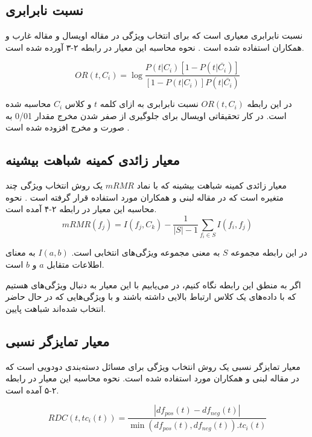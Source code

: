 \subsection{نسبت نابرابری}
نسبت نابرابری
معیاری است که برای انتخاب ویژگی در مقاله اویسال
  و مقاله غارب و همکاران  استفاده شده است
\cite{uysal2016improved}\cite{ghareb2016hybrid}
. نحوه محاسبه این معیار در رابطه ۲-۳ آورده شده است.

\begin{equation}
OR(t, C_i) = \log{\frac{P(t|C_i)[1-P(t|\bar{C_i})]}{[1-P(t|C_i)]P(t|\bar{C_i})}}
\end{equation}

در این رابطه
$OR(t, C_i)$
نسبت نابرابری به ازای کلمه
$t$
و کلاس
$C_i$
محاسبه شده است. در کار تحقیقاتی اویسال برای جلوگیری از صفر شدن مخرج مقدار 0/01 به صورت و مخرج افزوده شده است
\cite{uysal2016improved}
.

\subsection{معیار زائدی کمینه شباهت بیشینه}
معیار زائدی کمینه شباهت بیشینه
که با نماد 
$mRMR$
یک روش انتخاب ویژگی چند متغیره است که در مقاله لبنی و همکاران مورد استفاده قرار گرفته است
\cite{labani2018novel}
. نحوه محاسبه این معیار در رابطه ۲-۴ آمده است.
\begin{equation}
mRMR(f_j) = I(f_j, C_k) - \frac{1}{|S|-1} \sum_{f_i \in S} I(f_i, f_j)
\end{equation}

در این رابطه مجموعه
$S$
به معنی مجموعه ویژگی‌های انتخابی است.
$I(a, b)$
به معنای اطلاعات متقابل
$a$
و
$b$
است.

اگر به منطق این رابطه نگاه کنیم، در می‌یابیم با این معیار به دنبال ویژگی‌های هستیم که با داده‌های یک کلاس ارتباط بالایی داشته باشند و با ویژگی‌هایی که در حال حاضر انتخاب شده‌‌اند شباهت پایین.

\subsection{معیار تمایزگر نسبی}
معیار تمایزگر نسبی یک روش انتخاب ویژگی برای مسائل دسته‌بندی دودویی است که در مقاله لبنی و همکاران\cite{labani2018novel} مورد استفاده شده است. نحوه محاسبه این معیار در رابطه ۲-۵ آمده است.

\begin{equation}
RDC(t, tc_i(t)) = \frac{|df_{pos}(t)-df_{neg}(t)|}{\min(df_{pos}(t),df_{neg}(t)).tc_i(t)}
\end{equation}

